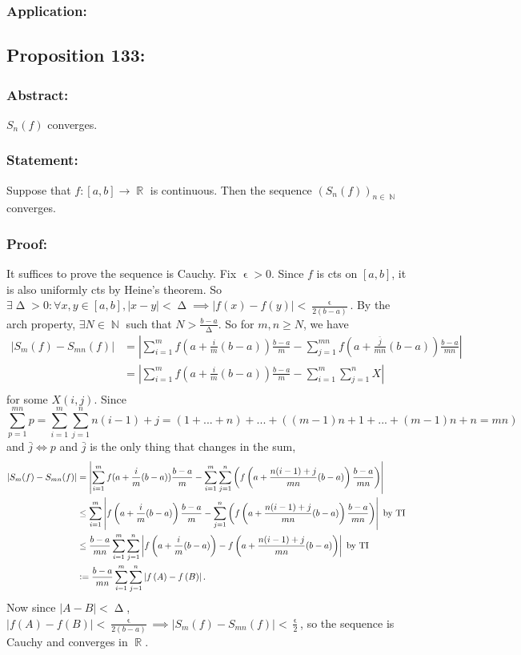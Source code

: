 \documentclass{article}
\DeclareMathOperator\eps{\epsilon}
\DeclareMathOperator\Del{\Delta}
\DeclareMathOperator\R{\mathbb{R}}
\DeclareMathOperator\N{\mathbb{N}}
\begin{document}
\subsubsection*{Application:}

\subsection{Proposition 133:}
\subsubsection*{Abstract:}
$S_n(f)$ converges.
\subsubsection*{Statement:}
Suppose that $f:[a,b] \to \R$ is continuous. Then the sequence
$(S_n(f))_{n \in \N}$
converges.
\subsubsection*{Proof:}
It suffices to prove the sequence is Cauchy. Fix $\eps > 0$.
Since $f$ is cts
on $[a,b]$, it is also uniformly cts by Heine's theorem. So $\exists \Del>0:\forall x,y \in [a,b], |x-y|<\Del \implies
|f(x)-f(y)|< \frac{ \eps }{2(b-a)}$. By the arch property, $\exists N \in \N$ such that $N > \frac{b-a}{\Del}$. So
for $m,n \geq N$, we have
\begin{align*}
|S_m(f) - S_{mn}(f)| &= \left| \sum_{i=1}^{m}f \left( a+\frac{i}{m}(b-a) \right)
\frac{b-a}{m} - \sum_{j=1}^{mn}f \left( a+\frac{\bar{j}}{mn}(b-a) \right) \frac{b-a}{mn} \right| \\
&= \left| \sum_{i=1}^{m}f \left( a+\frac{i}{m}(b-a) \right) \frac{b-a}{m} - \sum_{i=1}^{m}\sum_{j=1}^{n}X \right| \\
\end{align*}
for some $X(i,j)$. Since $$\sum_{p=1}^{mn}p = \sum_{i=1}^{m}\sum_{j=1}^{n}n(i-1)+j = (1+...+n)+...+((m-1)n+1+...+(m-1)n+n=mn)$$
and $\bar{j} \iff p$ and $\bar{j}$ is the only thing that changes in the sum, \begin{align*}
|S_m(f) - S_{mn}(f)| &=
\left| \sum_{i=1}^{m}f(a+\frac{i}{m}(b-a))\frac{b-a}{m} - \sum_{i=1}^{m}\sum_{j=1}^{n} \left( f \left( a+\frac{n(i-1)+j}{mn}(b-a) \right) \frac{b-a}{mn} \right) \right| \\
& \leq \sum_{i=1}^{m} \left| f \left( a+\frac{i}{m}(b-a) \right) \frac{b-a}{m} - \sum_{j=1}^{n}
\left( f \left( a+\frac{n(i-1)+j}{mn}(b-a) \right) \frac{b-a}{mn} \right) \right| \text{ by TI } \\
& \leq \frac{b-a}{mn} \sum_{i=1}^{m} \sum_{j=1}^{n}
\left| f \left( a+\frac{i}{m}(b-a) \right) -
f \left( a+\frac{n(i-1)+j}{mn}(b-a) \right) \right| \text{ by TI } \\
&\vcentcolon= \frac{b-a}{mn} \sum_{i=1}^{m} \sum_{j=1}^{n}
\left| f \left( A \right) -
f \left( B \right) \right|.\\
\end{align*}
Now since $|A-B|
 < \Del$, $|f(A)-f(B)| < \frac{\eps}{2(b-a)}
 \implies |S_m(f) - S_{mn}(f)| < \frac{\eps}{2}$,
 so the sequence is Cauchy and converges in $\R$.
\end{document}
